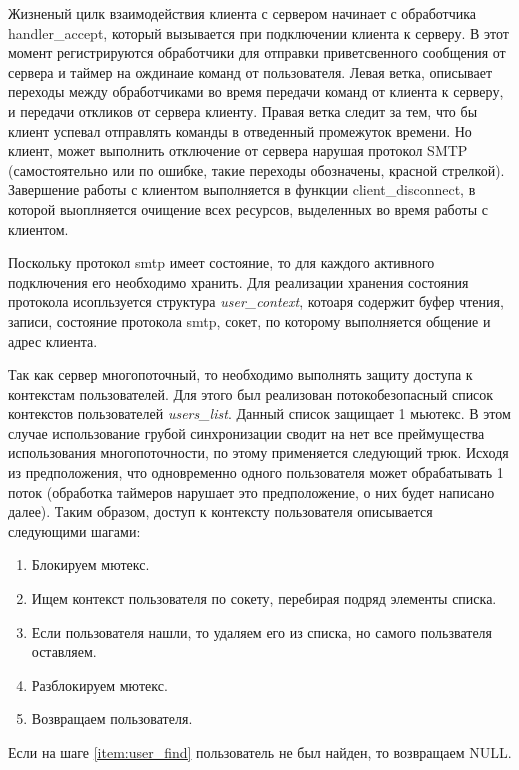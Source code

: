 \documentclass[a4paper,12pt]{report}
\begin{document}
	Жизненый цилк взаимодействия клиента с сервером начинает с обработчика handler\_accept, который вызывается при подключении клиента к серверу. В этот момент регистрируются обработчики для отправки приветсвенного сообщения от сервера и таймер на ождинаие команд от пользователя. Левая ветка, описывает переходы между обработчиками во время передачи команд от клиента к серверу, и передачи откликов от сервера клиенту. Правая ветка следит за тем, что бы клиент успевал отправлять команды в отведенный промежуток времени. Но клиент, может выполнить отключение от сервера нарушая протокол SMTP (самостоятельно или по ошибке, такие переходы обозначены, красной стрелкой). Завершение работы с клиентом выполняется в функции client\_disconnect, в которой выоплняется очищение всех ресурсов, выделенных во время работы с клиентом.

	Поскольку протокол smtp имеет состояние, то для каждого активного подключения его необходимо хранить. Для реализации хранения состояния протокола исопльзуется структура \textit{user\_context}, котоаря содержит буфер чтения, записи, состояние протокола smtp, сокет, по которому выполняется общение и адрес клиента. 

	Так как сервер многопоточный, то необходимо выполнять защиту доступа к контекстам пользователей. Для этого был реализован потокобезопасный список контекстов пользователей \textit{users\_list}. Данный список защищает 1 мьютекс. В этом случае использование грубой синхронизации сводит на нет все преймущества использования многопоточности, по этому применяется следующий трюк. Исходя из предположения, что одновременно одного пользователя может обрабатывать 1 поток (обработка таймеров нарушает это предположение, о них будет написано далее). Таким образом, доступ к контексту пользователя описывается следующими шагами:
	
	\begin{enumerate}
		\item Блокируем мютекс.
		\item \label{item:user_find} Ищем контекст пользователя по сокету, перебирая подряд элементы списка.
		\item  Если пользователя нашли, то удаляем его из списка, но самого пользвателя оставляем. 
		\item Разблокируем мютекс.
		\item Возвращаем пользователя. 
	\end{enumerate}

	Если на шаге \ref{item:user_find} пользователь не был найден, то возвращаем NULL.
	
\end{document}
